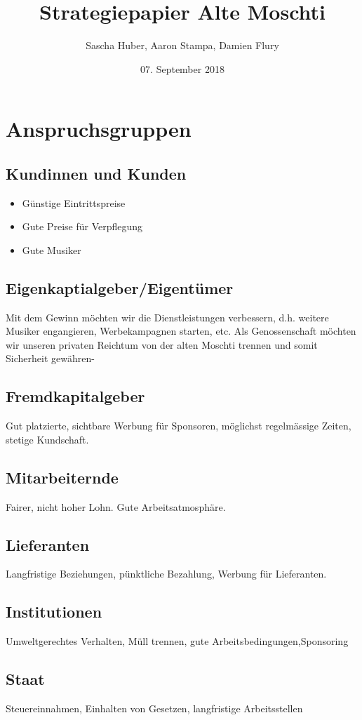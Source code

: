 \documentclass[a4paper, titlepage]{article}
\title{Strategiepapier Alte Moschti}
\author{Sascha Huber, Aaron Stampa, Damien Flury}
\date{07. September 2018}
\begin{document}
\maketitle

\tableofcontents
\newpage

\section{Anspruchsgruppen}
\subsection{Kundinnen und Kunden}
\begin{itemize}
  \item Günstige Eintrittspreise
  \item Gute Preise für Verpflegung
  \item Gute Musiker
\end{itemize}
\subsection{Eigenkaptialgeber/Eigentümer}
Mit dem Gewinn möchten wir die Dienstleistungen verbessern, d.h. weitere Musiker engangieren,
Werbekampagnen starten, etc. Als Genossenschaft möchten wir unseren privaten Reichtum von der
alten Moschti trennen und somit Sicherheit gewähren-
\subsection{Fremdkapitalgeber}
Gut platzierte, sichtbare Werbung für Sponsoren, möglichst regelmässige Zeiten, stetige Kundschaft.
\subsection{Mitarbeiternde}
Fairer, nicht hoher Lohn. Gute Arbeitsatmosphäre.
\subsection{Lieferanten}
Langfristige Beziehungen, pünktliche Bezahlung, Werbung für Lieferanten.
\subsection{Institutionen}
Umweltgerechtes Verhalten, Müll trennen, gute Arbeitsbedingungen,Sponsoring
\subsection{Staat}
Steuereinnahmen, Einhalten von Gesetzen, langfristige Arbeitsstellen
\end{document}
